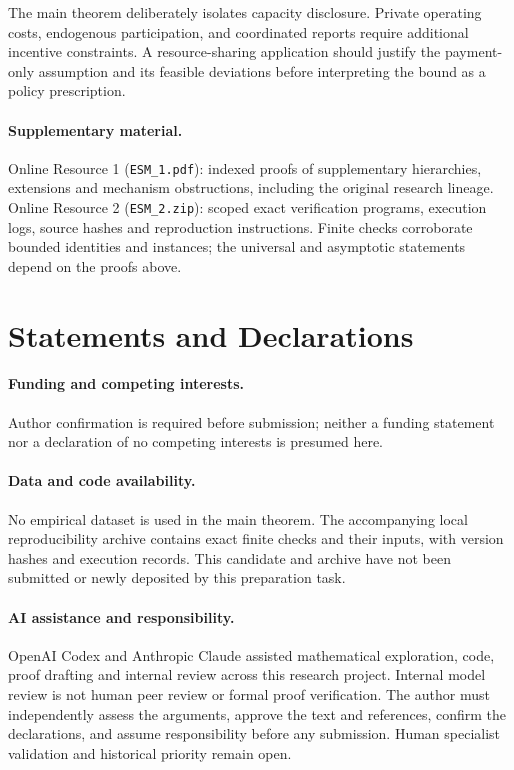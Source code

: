 \documentclass[11pt]{article}
\theoremstyle{definition}\newtheorem{definition}[theorem]{Definition}
\theoremstyle{remark}\newtheorem{remark}[theorem]{Remark}
\begin{document}
The main theorem deliberately isolates capacity disclosure. Private operating
costs, endogenous participation, and coordinated reports require additional
incentive constraints. A resource-sharing application should justify the
payment-only assumption and its feasible deviations before interpreting the
bound as a policy prescription.

\paragraph{Supplementary material.}
Online Resource 1 (\texttt{ESM\_1.pdf}): indexed proofs of supplementary
hierarchies, extensions and mechanism obstructions, including the original
research lineage. Online Resource 2 (\texttt{ESM\_2.zip}): scoped exact
verification programs, execution logs, source hashes and reproduction
instructions. Finite checks corroborate bounded identities and instances;
the universal and asymptotic statements depend on the proofs above.

\section*{Statements and Declarations}
\paragraph{Funding and competing interests.}
Author confirmation is required before submission; neither a funding statement
nor a declaration of no competing interests is presumed here.
\paragraph{Data and code availability.}
No empirical dataset is used in the main theorem. The accompanying local
reproducibility archive contains exact finite checks and their inputs, with
version hashes and execution records. This candidate and archive have not
been submitted or newly deposited by this preparation task.
\paragraph{AI assistance and responsibility.}
OpenAI Codex and Anthropic Claude assisted mathematical exploration, code,
proof drafting and internal review across this research project. Internal
model review is not human peer review or formal proof verification. The
author must independently assess the arguments, approve the text and
references, confirm the declarations, and assume responsibility before any
submission. Human specialist validation and historical priority remain open.
\end{document}
